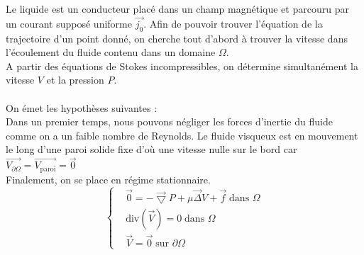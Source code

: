 \documentclass[a4paper,12pt,titlepage]{report}
\begin{document}
\begin{onehalfspace}
Le liquide est un conducteur placé dans un champ magnétique et parcouru par un courant supposé uniforme $\vec{j_0}$.
\normalsize 
Afin de pouvoir trouver l'équation de la trajectoire d’un point donné, on cherche tout d’abord à trouver la vitesse dans l'écoulement du fluide contenu dans un domaine $\Omega$.
\\A partir des équations de Stokes incompressibles, on détermine simultanément la vitesse  $V$ et la pression $P$. 
\\
\\
On émet les hypothèses suivantes :
\\
Dans un premier temps, nous pouvons négliger les forces d’inertie du fluide comme on a un faible nombre de Reynolds.
Le fluide visqueux est en mouvement le long d’une paroi solide fixe d’où une vitesse nulle sur le bord car 
$\vec{V_{\partial\Omega}}=\vec{V_{\text{paroi}}}=\vec{0}$
\\	
Finalement, on se place en régime stationnaire.
\begin{equation*}
  \left\{
    \begin{aligned}
      &\vec{0}=-\vec{\bigtriangledown}P +\mu\vec{\Delta}V +\vec{f}\;\text{dans }\Omega \\
      &\text{div}(\vec{V})=0\;\text{dans }\Omega \\     
      &\vec{V}=\vec{0}\;\text{sur }\partial\Omega
    \end{aligned}
  \right.
\end{equation*}


\end{onehalfspace}
\end{document}
